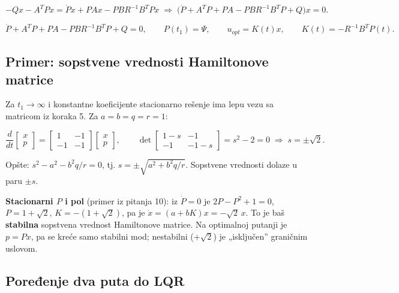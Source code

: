 \documentclass[11pt,a4paper,parskip=half,headsepline,numbers=noenddot]{scrartcl}
\begin{document}
\[-Qx - A^TPx = \dot Px + PAx - PBR^{-1}B^TPx \;\Rightarrow\; \big(\dot P + A^TP + PA - PBR^{-1}B^TP + Q\big)x = 0 .\]

\[\dot P + A^TP + PA - PBR^{-1}B^TP + Q = 0, \qquad P(t_1) = \Psi, \qquad u_{opt} = K(t)x, \qquad K(t) = -R^{-1}B^TP(t) .\]

\subsection{Primer: sopstvene vrednosti Hamiltonove matrice}

Za \(t_1 \to \infty\) i konstantne koeficijente stacionarno rešenje ima lepu vezu sa matricom iz koraka 5. Za \(a = b = q = r = 1\):

\[\frac{d}{dt}\begin{bmatrix} x \\ p \end{bmatrix} = \begin{bmatrix} 1 & -1 \\ -1 & -1 \end{bmatrix}\begin{bmatrix} x \\ p \end{bmatrix}, \qquad \det\begin{bmatrix} 1 - s & -1 \\ -1 & -1 - s \end{bmatrix} = s^2 - 2 = 0 \;\Rightarrow\; s = \pm\sqrt2 .\]

Opšte: \(s^2 - a^2 - b^2q/r = 0\), tj. \(s = \pm\sqrt{a^2 + b^2q/r}\). Sopstvene vrednosti dolaze u paru \(\pm s\).

\textbf{Stacionarni \(P\) i pol} (primer iz pitanja 10): iz \(\dot P = 0\) je \(2P - P^2 + 1 = 0\), \(P = 1 + \sqrt2\), \(K = -(1 + \sqrt2)\), pa je \(\dot x = (a + bK)x = -\sqrt2\,x\). To je baš \textbf{stabilna} sopstvena vrednost Hamiltonove matrice. Na optimalnoj putanji je \(p = Px\), pa se kreće samo stabilni mod; nestabilni (\(+\sqrt2\)) je „isključen'' graničnim uslovom.

\subsection{Poređenje dva puta do LQR}
\end{document}
